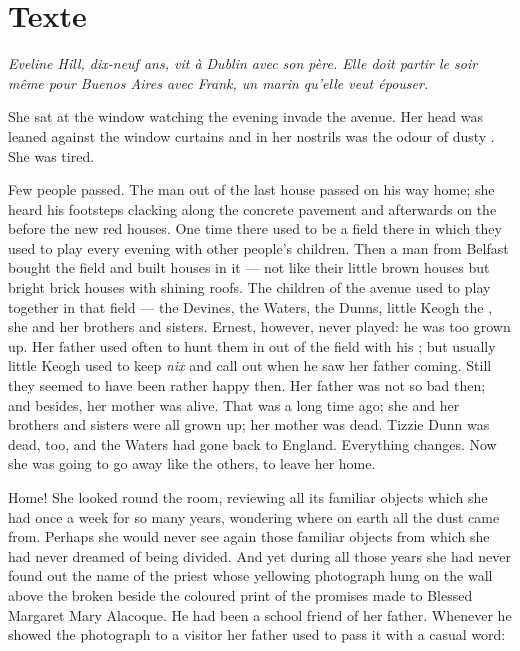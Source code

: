 \documentclass{fiche}
\begin{document}
\section{Texte}

\noindent\small\textit{Eveline Hill, dix-neuf ans, vit à Dublin avec son père. Elle doit
partir le soir même pour Buenos Aires avec Frank, un marin qu'elle veut épouser.}\normalsize

\begin{texte}
She sat at the window watching the evening invade the avenue. Her head was leaned against the
window curtains and in her nostrils was the odour of dusty
. She was tired.

Few people passed. The man out of the last house passed on his way home; she heard his
footsteps clacking along the concrete pavement and afterwards
 on the  before the new red houses. One time there used to be a field there in which they
used to play every evening with other people's children. Then a man from Belfast bought the
field and built houses in it --- not like their little brown houses but bright brick houses
with shining roofs. The children of the avenue used to play together in that field --- the
Devines, the Waters, the Dunns, little Keogh the , she and
her brothers and sisters. Ernest, however, never played: he was too grown up. Her father used
often to hunt them in out of the field with his ; but usually little Keogh used to keep \emph{nix} and call out
when he saw her father coming. Still they seemed to have been rather happy then. Her father
was not so bad then; and besides, her mother was alive. That was a long time ago; she and her
brothers and sisters were all grown up; her mother was dead. Tizzie Dunn was dead, too, and
the Waters had gone back to England. Everything changes. Now she was going to go away like the
others, to leave her home.

Home! She looked round the room, reviewing all its familiar objects which she had
 once a week for so many years, wondering where on earth all
the dust came from. Perhaps she would never see again those familiar objects from which she
had never dreamed of being divided. And yet during all those years she had never found out
the name of the priest whose yellowing photograph hung on the wall above the broken
 beside the coloured print of the promises made to
Blessed Margaret Mary Alacoque. He had been a school friend of her father. Whenever he showed
the photograph to a visitor her father used to pass it with a casual word:


\end{texte}
\end{document}
